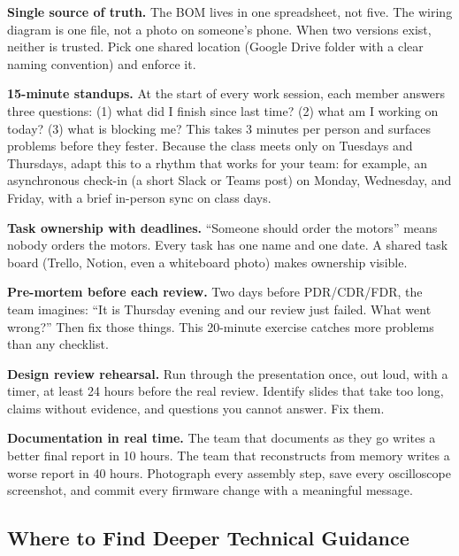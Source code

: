 \textbf{Single source of truth.} The BOM lives in one spreadsheet, not five. The wiring diagram is one file, not a photo on someone's phone. When two versions exist, neither is trusted. Pick one shared location (Google Drive folder with a clear naming convention) and enforce it.

\textbf{15-minute standups.} At the start of every work session, each member answers three questions: (1) what did I finish since last time? (2) what am I working on today? (3) what is blocking me? This takes 3 minutes per person and surfaces problems before they fester. Because the class meets only on Tuesdays and Thursdays, adapt this to a rhythm that works for your team: for example, an asynchronous check-in (a short Slack or Teams post) on Monday, Wednesday, and Friday, with a brief in-person sync on class days.

\textbf{Task ownership with deadlines.} ``Someone should order the motors'' means nobody orders the motors. Every task has one name and one date. A shared task board (Trello, Notion, even a whiteboard photo) makes ownership visible.

\textbf{Pre-mortem before each review.} Two days before PDR/CDR/FDR, the team imagines: ``It is Thursday evening and our review just failed. What went wrong?'' Then fix those things. This 20-minute exercise catches more problems than any checklist.

\textbf{Design review rehearsal.} Run through the presentation once, out loud, with a timer, at least 24 hours before the real review. Identify slides that take too long, claims without evidence, and questions you cannot answer. Fix them.

\textbf{Documentation in real time.} The team that documents as they go writes a better final report in 10 hours. The team that reconstructs from memory writes a worse report in 40 hours. Photograph every assembly step, save every oscilloscope screenshot, and commit every firmware change with a meaningful message.

\subsection{Where to Find Deeper Technical Guidance}

